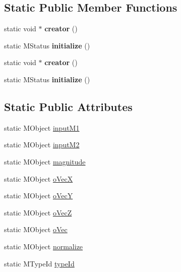 \subsection*{Static Public Member Functions}
\begin{DoxyCompactItemize}
\item 
\hypertarget{class_m_g__vector_a4a84b7bfa0e06ce993b8b03d9a95c50c}{static void $\ast$ {\bfseries creator} ()}\label{class_m_g__vector_a4a84b7bfa0e06ce993b8b03d9a95c50c}

\item 
\hypertarget{class_m_g__vector_ab2703616d4245176896a792964f28982}{static M\-Status {\bfseries initialize} ()}\label{class_m_g__vector_ab2703616d4245176896a792964f28982}

\item 
\hypertarget{class_m_g__vector_a4a84b7bfa0e06ce993b8b03d9a95c50c}{static void $\ast$ {\bfseries creator} ()}\label{class_m_g__vector_a4a84b7bfa0e06ce993b8b03d9a95c50c}

\item 
\hypertarget{class_m_g__vector_ab2703616d4245176896a792964f28982}{static M\-Status {\bfseries initialize} ()}\label{class_m_g__vector_ab2703616d4245176896a792964f28982}

\end{DoxyCompactItemize}
\subsection*{Static Public Attributes}
\begin{DoxyCompactItemize}
\item 
static M\-Object \hyperlink{class_m_g__vector_a442ebd6c40bb57b043081c3feb80de8d}{input\-M1}
\item 
static M\-Object \hyperlink{class_m_g__vector_ad2068ee6d5828d8ef653b3b296d92dcc}{input\-M2}
\item 
static M\-Object \hyperlink{class_m_g__vector_a234df1cfa76968bc856b83c80b30f5d6}{magnitude}
\item 
static M\-Object \hyperlink{class_m_g__vector_ac3d4326cf87a24ff99a3a1e746997919}{o\-Vec\-X}
\item 
static M\-Object \hyperlink{class_m_g__vector_a8b7f9011aa8c58993f9946dfc4b539df}{o\-Vec\-Y}
\item 
static M\-Object \hyperlink{class_m_g__vector_adcfd5002d7260461ba813c5e77668022}{o\-Vec\-Z}
\item 
static M\-Object \hyperlink{class_m_g__vector_a8e3c1d4392648a517a240e749e4acfd4}{o\-Vec}
\item 
static M\-Object \hyperlink{class_m_g__vector_a0da85667dd839cd51882829a3c168a6c}{normalize}
\item 
static M\-Type\-Id \hyperlink{class_m_g__vector_ac4417888ca111086a0b3e5778041cb7e}{type\-Id}
\end{DoxyCompactItemize}


